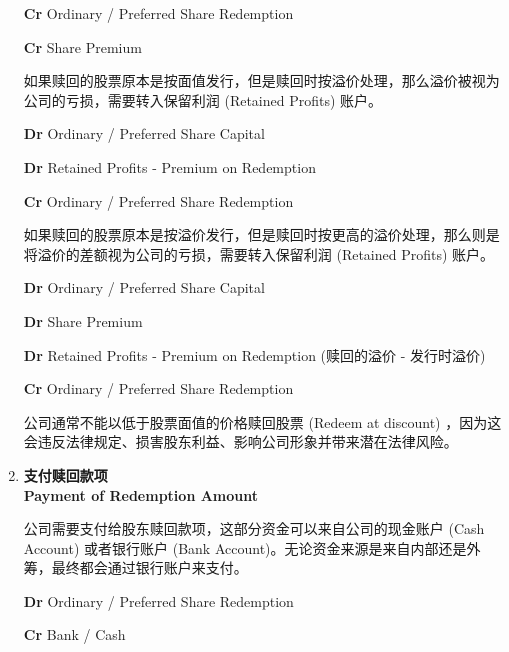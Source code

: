 \documentclass{article}
\begin{document}
\begin{enumerate}
\begin{mdframed}[backgroundcolor=gray!10]
    \hspace{1.7em}\textbf{Cr} Ordinary / Preferred Share Redemption

    \hspace{1.7em}\textbf{Cr} Share Premium
    \end{mdframed}

    \newpage
    如果赎回的股票原本是按面值发行，但是赎回时按溢价处理，那么溢价被视为公司的亏损，需要转入保留利润 (Retained Profits) 账户。
    \begin{mdframed}[backgroundcolor=gray!10]
        \textbf{Dr} Ordinary / Preferred Share Capital

        \textbf{Dr} Retained Profits - Premium on Redemption

        \hspace{1.7em}\textbf{Cr} Ordinary / Preferred Share Redemption
    \end{mdframed}

    如果赎回的股票原本是按溢价发行，但是赎回时按更高的溢价处理，那么则是将溢价的差额视为公司的亏损，需要转入保留利润 (Retained Profits) 账户。
    \begin{mdframed}[backgroundcolor=gray!10]
        \textbf{Dr} Ordinary / Preferred Share Capital

        \textbf{Dr} Share Premium

        \textbf{Dr} Retained Profits - Premium on Redemption (赎回的溢价 - 发行时溢价)

        \hspace{1.7em}\textbf{Cr} Ordinary / Preferred Share Redemption
    \end{mdframed}

    公司通常不能以低于股票面值的价格赎回股票 (Redeem at discount) ，因为这会违反法律规定、损害股东利益、影响公司形象并带来潜在法律风险。

    \item \textbf{支付赎回款项\\Payment of Redemption Amount}
    
    公司需要支付给股东赎回款项，这部分资金可以来自公司的现金账户 (Cash Account) 或者银行账户 (Bank Account)。无论资金来源是来自内部还是外筹，最终都会通过银行账户来支付。

    \begin{mdframed}[backgroundcolor=gray!10]
    \textbf{Dr} Ordinary / Preferred Share Redemption

    \hspace{1.7em}\textbf{Cr} Bank / Cash
    \end{mdframed}
    

\end{enumerate}
\end{document}

